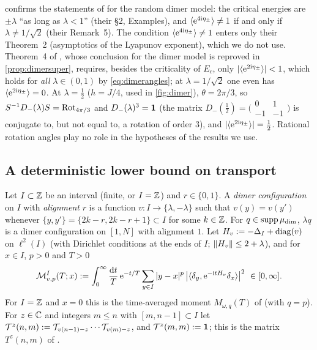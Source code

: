\begin{remark}\label{rem:dimerjsbs}
 confirms the statements of \cite{JSBS2003} for the random dimer model: the
critical energies are $\pm\lambda$ ``as long as $\lambda<1$'' (their \S2, Examples), and
$\langle\mathrm{e}^{4\mathrm{i}\eta_\pm}\rangle\neq1$ if and only if $\lambda\neq1/\sqrt2$ (their Remark~5).  The
condition $\langle\mathrm{e}^{4\mathrm{i}\eta_\pm}\rangle\ne1$ enters only their Theorem~2 (asymptotics of the Lyapunov
exponent), which we do not use.  Theorem~4 of \cite{JSBS2003}, whose conclusion for the dimer model is reproved in
\cref{prop:dimersuper}, requires,
besides the criticality of $E_c$, only $|\langle\mathrm{e}^{2\mathrm{i}\eta_\pm}\rangle|<1$, which holds for \emph{all}
$\lambda\in(0,1)$ by
\eqref{eq:dimerangles}; at $\lambda=1/\sqrt2$ one even has $\langle\mathrm{e}^{2\mathrm{i}\eta_\pm}\rangle=0$.  At
$\lambda=\frac12$ ($h=J/4$, used in \cref{fig:dimer}), $\theta=2\pi/3$, so $S^{-1}D_-(\lambda)S=\mathrm{Rot}_{4\pi/3}$ and
$D_-(\lambda)^3=\mathbf{1}$ (the matrix $D_-(\frac12)=\bigl(\begin{smallmatrix}0&1\\-1&-1\end{smallmatrix}\bigr)$ is conjugate to,
but not equal to, a rotation of order $3$), and $|\langle\mathrm{e}^{2\mathrm{i}\eta_\pm}\rangle|=\frac12$.  Rational rotation angles play no role in the
hypotheses of the results we use.
\end{remark}

\subsection{A deterministic lower bound on transport}\label{sec:dimer:lower}

Let $I\subset\mathbb{Z}$ be an interval (finite, or $I=\mathbb{Z}$) and $r\in\{0,1\}$.  A \emph{dimer configuration} on
$I$ with \emph{alignment} $r$ is a function $v:I\to\{\lambda,-\lambda\}$ such that $v(y)=v(y')$ whenever
$\{y,y'\}=\{2k-r,2k-r+1\}\subset I$ for some $k\in\mathbb{Z}$.  For $q\in\operatorname{supp}\mu_{\mathrm{dim}}$, $\lambda q$ is a dimer
configuration on $[1,N]$ with alignment $1$.  Let $H_v:=-\Delta_I+\operatorname{diag}(v)$ on $\ell^2(I)$ (with
Dirichlet conditions at the ends of $I$; $\left\|H_v\right\|\le2+\lambda$), and for $x\in I$, $p>0$ and $T>0$
\begin{equation}\label{eq:Mom}
  \Mom^I_{v,p}(T;x):=\int_0^\infty\frac{\dd t}{T}\,\e^{-t/T}\sum_{y\in I}|y-x|^p\,
  \bigl|\langle\delta_y,\e^{-\ii tH_v}\delta_x\rangle\bigr|^2\ \in[0,\infty].
\end{equation}
For $I=\mathbb{Z}$ and $x=0$ this is the time-averaged moment $M_{\omega,q}(T)$ of \cite[Eq.~(9)]{JSBS2003}
(with $q=p$).  For $z\in\mathbb{C}$ and integers $m\le n$ with $[m,n-1]\subset I$ let
$\mathcal{T}^z(n,m):=\mathcal{T}_{v(n-1)-z}\cdots\mathcal{T}_{v(m)-z}$, and $\mathcal{T}^z(m,m):=\mathbf{1}$; this is the matrix
$T^z(n,m)$ of \cite{JSBS2003}.

